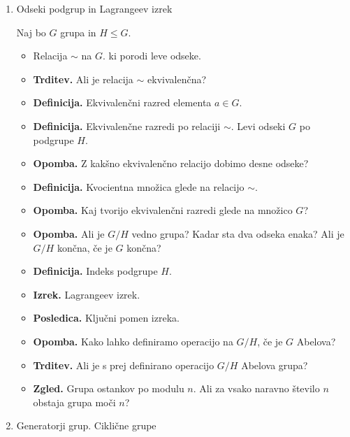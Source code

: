 \begin{enumerate}
    \item Odseki podgrup in Lagrangeev izrek
    
    Naj bo \(G\) grupa in \(H \leq G\).
    \begin{itemize}
        \item Relacija \(\sim\) na \(G\). ki porodi leve odseke.
        \item \textbf{Trditev.} Ali je relacija \(\sim\) ekvivalenčna?
        \item \textbf{Definicija.} Ekvivalenčni razred elementa \(a \in G\).
        \item \textbf{Definicija.} Ekvivalenčne razredi po relaciji \(\sim\). Levi odseki \(G\) po podgrupe \(H\).
        \item \textbf{Opomba.} Z kakšno ekvivalenčno relacijo dobimo desne odseke?
        \item \textbf{Definicija.} Kvocientna množica glede na relacijo \(\sim\).
        \item \textbf{Opomba.} Kaj tvorijo ekvivalenčni razredi glede na množico \(G\)?
        \item \textbf{Opomba.} Ali je \(G/H\) vedno grupa? Kadar sta dva odseka enaka? Ali je \(G/H\) končna, če je \(G\) končna?
        \item \textbf{Definicija.} Indeks podgrupe \(H\).
        \item \textbf{Izrek.} Lagrangeev izrek.
        \item \textbf{Posledica.} Ključni pomen izreka.
        \item \textbf{Opomba.} Kako lahko definiramo operacijo na \(G/H\), če je \(G\) Abelova?
        \item \textbf{Trditev.} Ali je s prej definirano operacijo \(G/H\) Abelova grupa?
        \item \textbf{Zgled.} Grupa ostankov po modulu \(n\). Ali za vsako naravno število \(n\) obstaja grupa moči \(n\)?
    \end{itemize}

    \item Generatorji grup. Ciklične grupe
    

\end{enumerate}
